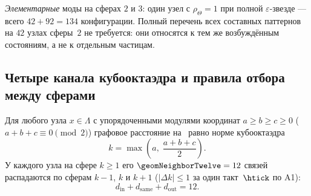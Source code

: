 \emph{Элементарные} моды на сферах $2$ и $3$: один узел с $\rho_\Theta=1$
при полной $\varepsilon$-звезде --- всего $42+92=134$ конфигурации.
Полный перечень всех составных паттернов на $42$ узлах сферы~$2$ не требуется:
они относятся к тем же возбуждённым состояниям, а не к отдельным частицам.

\subsection{Четыре канала кубооктаэдра и правила отбора между сферами}
\label{sec:floor1-four-channels}

Для любого узла $x\in\Lambda$ с упорядоченными модулями координат $a\ge b\ge c\ge 0$ ($a+b+c\equiv 0\pmod 2$)
графовое расстояние на \latGCKshort\ равно норме кубооктаэдра
\[
  k = \max\!\left(a,\;\frac{a+b+c}{2}\right).
\]
У каждого узла на сфере $k\ge 1$ его $\geomNeighborTwelve=12$ связей распадаются по сферам $k-1$, $k$ и $k+1$
($|\Delta k|\le 1$ за один такт~$\htick$ по A1):
\[
  d_{\mathrm{in}} + d_{\mathrm{same}} + d_{\mathrm{out}} = 12.
\]

